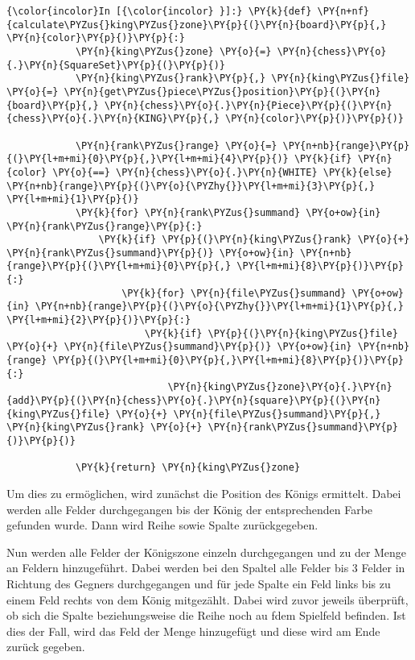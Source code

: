     \begin{Verbatim}[commandchars=\\\{\}]
{\color{incolor}In [{\color{incolor} }]:} \PY{k}{def} \PY{n+nf}{calculate\PYZus{}king\PYZus{}zone}\PY{p}{(}\PY{n}{board}\PY{p}{,} \PY{n}{color}\PY{p}{)}\PY{p}{:}
            \PY{n}{king\PYZus{}zone} \PY{o}{=} \PY{n}{chess}\PY{o}{.}\PY{n}{SquareSet}\PY{p}{(}\PY{p}{)}
            \PY{n}{king\PYZus{}rank}\PY{p}{,} \PY{n}{king\PYZus{}file} \PY{o}{=} \PY{n}{get\PYZus{}piece\PYZus{}position}\PY{p}{(}\PY{n}{board}\PY{p}{,} \PY{n}{chess}\PY{o}{.}\PY{n}{Piece}\PY{p}{(}\PY{n}{chess}\PY{o}{.}\PY{n}{KING}\PY{p}{,} \PY{n}{color}\PY{p}{)}\PY{p}{)}
        
            \PY{n}{rank\PYZus{}range} \PY{o}{=} \PY{n+nb}{range}\PY{p}{(}\PY{l+m+mi}{0}\PY{p}{,}\PY{l+m+mi}{4}\PY{p}{)} \PY{k}{if} \PY{n}{color} \PY{o}{==} \PY{n}{chess}\PY{o}{.}\PY{n}{WHITE} \PY{k}{else} \PY{n+nb}{range}\PY{p}{(}\PY{o}{\PYZhy{}}\PY{l+m+mi}{3}\PY{p}{,} \PY{l+m+mi}{1}\PY{p}{)}
            \PY{k}{for} \PY{n}{rank\PYZus{}summand} \PY{o+ow}{in} \PY{n}{rank\PYZus{}range}\PY{p}{:}
                \PY{k}{if} \PY{p}{(}\PY{n}{king\PYZus{}rank} \PY{o}{+} \PY{n}{rank\PYZus{}summand}\PY{p}{)} \PY{o+ow}{in} \PY{n+nb}{range}\PY{p}{(}\PY{l+m+mi}{0}\PY{p}{,} \PY{l+m+mi}{8}\PY{p}{)}\PY{p}{:}
                    \PY{k}{for} \PY{n}{file\PYZus{}summand} \PY{o+ow}{in} \PY{n+nb}{range}\PY{p}{(}\PY{o}{\PYZhy{}}\PY{l+m+mi}{1}\PY{p}{,} \PY{l+m+mi}{2}\PY{p}{)}\PY{p}{:}
                        \PY{k}{if} \PY{p}{(}\PY{n}{king\PYZus{}file} \PY{o}{+} \PY{n}{file\PYZus{}summand}\PY{p}{)} \PY{o+ow}{in} \PY{n+nb}{range} \PY{p}{(}\PY{l+m+mi}{0}\PY{p}{,}\PY{l+m+mi}{8}\PY{p}{)}\PY{p}{:}
                            \PY{n}{king\PYZus{}zone}\PY{o}{.}\PY{n}{add}\PY{p}{(}\PY{n}{chess}\PY{o}{.}\PY{n}{square}\PY{p}{(}\PY{n}{king\PYZus{}file} \PY{o}{+} \PY{n}{file\PYZus{}summand}\PY{p}{,} \PY{n}{king\PYZus{}rank} \PY{o}{+} \PY{n}{rank\PYZus{}summand}\PY{p}{)}\PY{p}{)}
            
            \PY{k}{return} \PY{n}{king\PYZus{}zone}
\end{Verbatim}

    Um dies zu ermöglichen, wird zunächst die Position des Königs ermittelt.
Dabei werden alle Felder durchgegangen bis der König der entsprechenden
Farbe gefunden wurde. Dann wird Reihe sowie Spalte zurückgegeben.

Nun werden alle Felder der Königszone einzeln durchgegangen und zu der
Menge an Feldern hinzugeführt. Dabei werden bei den Spaltel alle Felder
bis 3 Felder in Richtung des Gegners durchgegangen und für jede Spalte
ein Feld links bis zu einem Feld rechts von dem König mitgezählt. Dabei
wird zuvor jeweils überprüft, ob sich die Spalte beziehungsweise die
Reihe noch au fdem Spielfeld befinden. Ist dies der Fall, wird das Feld
der Menge hinzugefügt und diese wird am Ende zurück gegeben.

